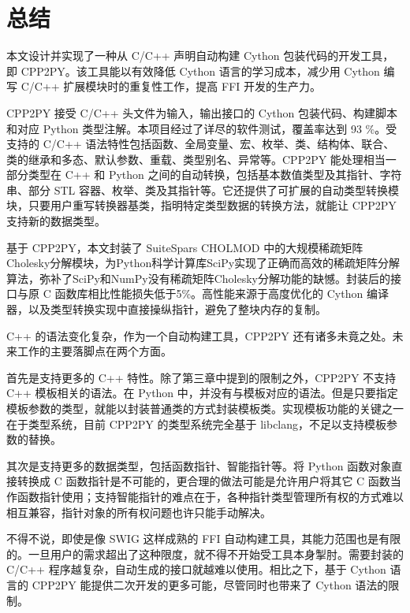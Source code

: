 
\chapter{总结}

本文设计并实现了一种从 C/C++ 声明自动构建 Cython 包装代码的开发工具，即 CPP2PY。该工具能以有效降低 Cython 语言的学习成本，减少用 Cython 编写 C/C++ 扩展模块时的重复性工作，提高 FFI 开发的生产力。

CPP2PY 接受 C/C++ 头文件为输入，输出接口的 Cython 包装代码、构建脚本和对应 Python 类型注解。本项目经过了详尽的软件测试，覆盖率达到 93 \%。受支持的 C/C++ 语法特性包括函数、全局变量、宏、枚举、类、结构体、联合、类的继承和多态、默认参数、重载、类型别名、异常等。CPP2PY 能处理相当一部分类型在 C++ 和 Python 之间的自动转换，包括基本数值类型及其指针、字符串、部分 STL 容器、枚举、类及其指针等。它还提供了可扩展的自动类型转换模块，只要用户重写转换器基类，指明特定类型数据的转换方法，就能让 CPP2PY 支持新的数据类型。 

基于 CPP2PY，本文封装了 SuiteSpars CHOLMOD 中的大规模稀疏矩阵Cholesky分解模块，为Python科学计算库SciPy实现了正确而高效的稀疏矩阵分解算法，弥补了SciPy和NumPy没有稀疏矩阵Cholesky分解功能的缺憾。封装后的接口与原 C 函数库相比性能损失低于5\%。高性能来源于高度优化的 Cython 编译器，以及类型转换实现中直接操纵指针，避免了整块内存的复制。

C++ 的语法变化复杂，作为一个自动构建工具，CPP2PY 还有诸多未竟之处。未来工作的主要落脚点在两个方面。

首先是支持更多的 C++ 特性。除了第三章中提到的限制之外，CPP2PY 不支持 C++ 模板相关的语法。在 Python 中，并没有与模板对应的语法。但是只要指定模板参数的类型，就能以封装普通类的方式封装模板类。实现模板功能的关键之一在于类型系统，目前 CPP2PY 的类型系统完全基于 libclang，不足以支持模板参数的替换。

其次是支持更多的数据类型，包括函数指针、智能指针等。将 Python 函数对象直接转换成 C 函数指针是不可能的，更合理的做法可能是允许用户将其它 C 函数当作函数指针使用；支持智能指针的难点在于，各种指针类型管理所有权的方式难以相互兼容，指针对象的所有权问题也许只能手动解决。

不得不说，即使是像 SWIG 这样成熟的 FFI 自动构建工具，其能力范围也是有限的。一旦用户的需求超出了这种限度，就不得不开始受工具本身掣肘。需要封装的 C/C++ 程序越复杂，自动生成的接口就越难以使用。相比之下，基于 Cython 语言的 CPP2PY 能提供二次开发的更多可能，尽管同时也带来了 Cython 语法的限制。